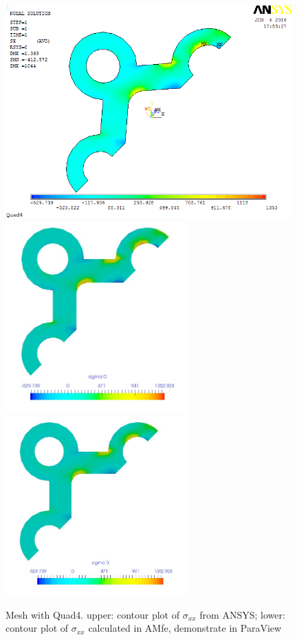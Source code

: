 \begin{figure}[htbp]
	\begin{center}
		\includegraphics[width=11cm,clip]{Quad4_Sxx.png} 
		\includegraphics[width=7cm,clip]{Quad4_Sxx_PD.png} 			
		\includegraphics[width=7cm,clip]{Quad4_Sxx_P.png} 		
		\caption{Mesh with Quad4. upper: contour plot of $\sigma_{xx}$ from ANSYS; lower: contour plot of $\sigma_{xx}$ calculated in AMfe, demonstrate in ParaView} \label{fig: Quad4_Sxx}
	\end{center}
\end{figure}
\clearpage 

